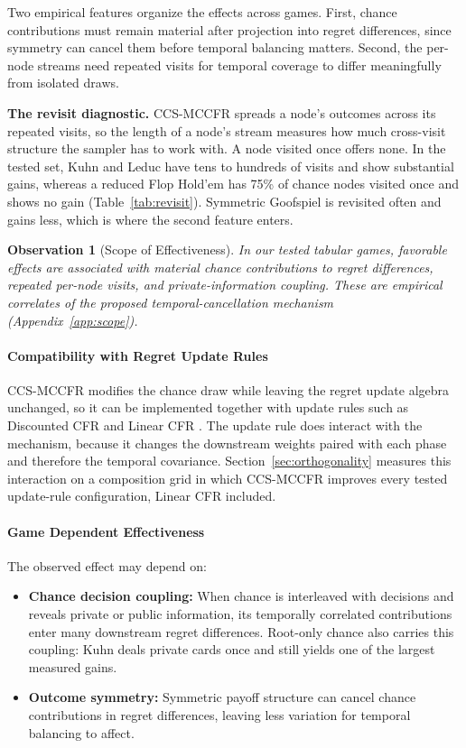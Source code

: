 \documentclass[11pt]{article}
\newtheorem{observation}{Observation}
\begin{document}
Two empirical features organize the effects across games. First, chance contributions must remain material after projection into regret differences, since symmetry can cancel them before temporal balancing matters. Second, the per-node streams need repeated visits for temporal coverage to differ meaningfully from isolated draws.

\textbf{The revisit diagnostic.} CCS-MCCFR spreads a node's outcomes across its repeated visits, so the length of a node's stream measures how much cross-visit structure the sampler has to work with. A node visited once offers none. In the tested set, Kuhn and Leduc have tens to hundreds of visits and show substantial gains, whereas a reduced Flop Hold'em has 75\% of chance nodes visited once and shows no gain (Table~\ref{tab:revisit}). Symmetric Goofspiel is revisited often and gains less, which is where the second feature enters.

\begin{observation}[Scope of Effectiveness]
\label{obs:scope}
In our tested tabular games, favorable effects are associated with material chance contributions to regret differences, repeated per-node visits, and private-information coupling. These are empirical correlates of the proposed temporal-cancellation mechanism (Appendix~\ref{app:scope}).
\end{observation}

\paragraph{Compatibility with Regret Update Rules}
\label{sec:theory-orth}

CCS-MCCFR modifies the chance draw while leaving the regret update algebra unchanged, so it can be implemented together with update rules such as Discounted CFR and Linear CFR \citep{brown2019solving}. The update rule does interact with the mechanism, because it changes the downstream weights paired with each phase and therefore the temporal covariance. Section~\ref{sec:orthogonality} measures this interaction on a composition grid in which CCS-MCCFR improves every tested update-rule configuration, Linear CFR included.

\paragraph{Game Dependent Effectiveness}

The observed effect may depend on:
\begin{itemize}
\item \textbf{Chance decision coupling:} When chance is interleaved with decisions and reveals private or public information, its temporally correlated contributions enter many downstream regret differences. Root-only chance also carries this coupling: Kuhn deals private cards once and still yields one of the largest measured gains.
\item \textbf{Outcome symmetry:} Symmetric payoff structure can cancel chance contributions in regret differences, leaving less variation for temporal balancing to affect.
\end{itemize}
\end{document}
